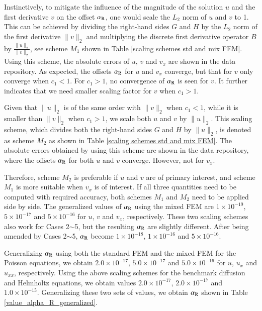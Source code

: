 \documentclass[review,3p]{elsarticle}
\begin{document}
Instinctively, to mitigate the influence of the magnitude of the solution $u$ and the first derivative $v$ on the offset $\alpha_{\rm R}$, one would scale the $L_2$ norm of $u$ and $v$ to 1. This can be achieved by dividing the right-hand sides $G$ and $H$ by the $L_2$ norm of the first derivative $\|v\|_{2}$ and multiplying the discrete first derivative operator $B$ by $\frac{\|u\|_{2}}{\|v\|_{2}}$, see scheme $M_1$ shown in Table \ref{scaling schemes std and mix FEM}.
Using this scheme, the absolute errors of $u$, $v$ and $v_{x}$ are shown in the data repository.
As expected, the offsets $\alpha_{\rm R}$ for $u$ and $v_{x}$ converge, but that for $v$ only converge when $c_1<1$.
For $c_1>1$, no convergence of $\alpha_{\rm R}$ is seen for $v$. It further indicates that we need smaller scaling factor for $v$ when $c_1>1$.



\newpage
Given that ${\|u\|_{2}}$ is of the same order with ${\|v\|_{2}}$ when $c_1<1$, while it is smaller than ${\|v\|_{2}}$ when $c_1>1$, we scale both $u$ and $v$ by $\|u\|_{2}$. This scaling scheme, which divides both the right-hand sides $G$ and $H$ by $\|u\|_{2}$, is denoted as scheme $M_2$ as shown in Table \ref{scaling schemes std and mix FEM}. The absolute errors obtained by using this scheme are shown in the data repository, where the offsets $\alpha_{\rm R}$ for both $u$ and $v$ converge. However, not for $v_{x}$.

Therefore, scheme $M_2$ is preferable if $u$ and $v$ are of primary interest, and scheme $M_1$ is more suitable when $v_{x}$ is of interest. 
If all three quantities need to be computed with required accuracy, both schemes $M_1$ and $M_2$ need to be applied side by side. 
The generalized values of $\alpha_{\rm R}$ using the mixed FEM are $1\times10^{-19}$, $5\times10^{-17}$ and $5\times10^{-16}$ for $u$, $v$ and $v_{x}$, respectively. 
These two scaling schemes also work for Cases 2$\sim$5, but the resulting $\alpha_{\rm R}$ are slightly different. After being amended by Cases 2$\sim$5, $\alpha_{\rm R}$ become $1\times10^{-18}$, $1\times10^{-16}$ and $5\times10^{-16}$.


Generalizing $\alpha_{\rm R}$ using both the standard FEM and the mixed FEM for the Poisson equations, we obtain $2.0\times10^{-17}$, $5.0\times10^{-17}$ and $5.0\times10^{-16}$ for $u$, $u_{x}$ and $u_{xx}$, respectively. Using the above scaling schemes for the benchmark diffusion and Helmholtz equations, we obtain values $2.0\times10^{-17}$, $2.0\times10^{-17}$ and $1.0\times10^{-15}$.
Generalizing these two sets of values, we obtain $\alpha_{\rm R}$ shown in Table \ref{value_alpha_R_generalized}.
\end{document}
